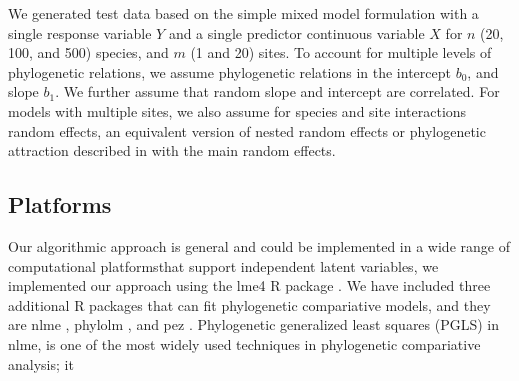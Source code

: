 We generated test data based on the simple mixed model formulation  with a single response variable $Y$ and a single predictor continuous variable $X$ for $n$ (20, 100, and 500) species, and $m$ (1 and 20) sites. 
To account for multiple levels of phylogenetic relations, we assume phylogenetic relations in the intercept $b_0$, and slope $b_1$.
We further assume that random slope and intercept are correlated. 
For models with multiple sites, we also assume for species and site interactions random effects, an equivalent version of nested random effects or phylogenetic attraction described in \cite{helmus2007separating} with the main random effects.

\subsection{Platforms}

Our algorithmic approach is general and could be implemented in a wide range of computational platformsthat support independent latent variables, we implemented our approach using the lme4 R package \citep{bates2015fitting}.
We have included three additional R packages that can fit phylogenetic compariative models, and they are nlme \citep{pinheiro2014r}, phylolm \citep{ho2014phylolm}, and pez \citep{pearse2015pez}.
Phylogenetic generalized least squares (PGLS) in nlme, is one of the most widely used techniques in phylogenetic compariative analysis; it  


% 
% 

